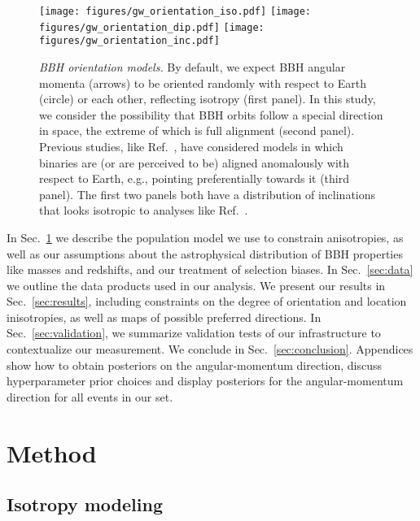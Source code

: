 \documentclass[aps,prd,twocolumn,superscriptaddress,preprintnumbers,floatfix,nofootinbib]{revtex4-2}
\newcommand*{\mi}[1]{{\color{magenta} [{\bf MAX}: #1]}}
\begin{document}


\begin{figure*}
\texttt{[image: figures/gw\_orientation\_iso.pdf]}
\texttt{[image: figures/gw\_orientation\_dip.pdf]}
\texttt{[image: figures/gw\_orientation\_inc.pdf]}
\caption{\emph{\ac{BBH} orientation models.} By default, we expect \ac{BBH} angular momenta (arrows) to be oriented randomly with respect to Earth (circle) or each other, reflecting isotropy (first panel).
In this study, we consider the possibility that \ac{BBH} orbits follow a special direction in space, the extreme of which is full alignment (second panel).
Previous studies, like Ref.~\cite{Vitale:2022pmu}, have considered models in which binaries are (or are perceived to be) aligned anomalously with respect to Earth, e.g., pointing preferentially towards it (third panel).
The first two panels both have a distribution of inclinations that looks isotropic to analyses like Ref.~\cite{Vitale:2022pmu}.
}
\label{fig:vectors}
\end{figure*}

In Sec.~\ref{sec:method} we describe the population model we use to constrain anisotropies, as well as our assumptions about the astrophysical distribution of \ac{BBH} properties like masses and redshifts, and our treatment of selection biases.
In Sec.~\ref{sec:data} we outline the data products used in our analysis.
We present our results in Sec.~\ref{sec:results}, including constraints on the degree of orientation and location inisotropies, as well as maps of possible preferred directions.
In Sec.~\ref{sec:validation}, we summarize validation tests of our infrastructure to contextualize our measurement.
We conclude in Sec.~\ref{sec:conclusion}.
Appendices show how to obtain posteriors on the angular-momentum direction, discuss hyperparameter prior choices and display posteriors for the angular-momentum direction for all events in our set.

\section{Method}
\label{sec:method}

\subsection{Isotropy modeling}

\newcommand*{\dip}[1]{\vec{v}_{#1}}
\newcommand*{\dipraw}[1]{\vec{u}_{#1}}
\end{document}
